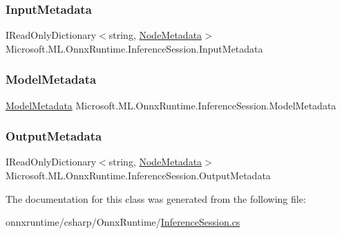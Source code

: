 \subsubsection{\texorpdfstring{Input\+Metadata}{InputMetadata}}
{\footnotesize\ttfamily I\+Read\+Only\+Dictionary$<$string, \mbox{\hyperlink{structMicrosoft_1_1ML_1_1OnnxRuntime_1_1NodeMetadata}{Node\+Metadata}}$>$ Microsoft.\+M\+L.\+Onnx\+Runtime.\+Inference\+Session.\+Input\+Metadata\hspace{0.3cm}{\ttfamily [get]}}

\mbox{\label{classMicrosoft_1_1ML_1_1OnnxRuntime_1_1InferenceSession_a55b76db5cd70a96614cc69ed6fa098c3}} 
\subsubsection{\texorpdfstring{Model\+Metadata}{ModelMetadata}}
{\footnotesize\ttfamily \mbox{\hyperlink{structMicrosoft_1_1ML_1_1OnnxRuntime_1_1ModelMetadata}{Model\+Metadata}} Microsoft.\+M\+L.\+Onnx\+Runtime.\+Inference\+Session.\+Model\+Metadata\hspace{0.3cm}{\ttfamily [get]}}

\mbox{\label{classMicrosoft_1_1ML_1_1OnnxRuntime_1_1InferenceSession_a6ec51749bbb6f364bb9af050c956066f}} 
\subsubsection{\texorpdfstring{Output\+Metadata}{OutputMetadata}}
{\footnotesize\ttfamily I\+Read\+Only\+Dictionary$<$string, \mbox{\hyperlink{structMicrosoft_1_1ML_1_1OnnxRuntime_1_1NodeMetadata}{Node\+Metadata}}$>$ Microsoft.\+M\+L.\+Onnx\+Runtime.\+Inference\+Session.\+Output\+Metadata\hspace{0.3cm}{\ttfamily [get]}}



The documentation for this class was generated from the following file\+:\begin{DoxyCompactItemize}
\item 
onnxruntime/csharp/\+Onnx\+Runtime/\mbox{\hyperlink{InferenceSession_8cs}{Inference\+Session.\+cs}}\end{DoxyCompactItemize}
